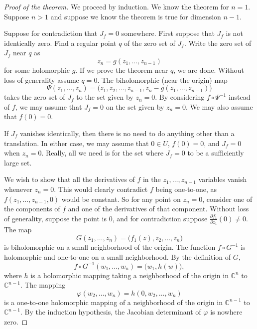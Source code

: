 \documentclass[12pt,openany]{book}
\newcommand{\C}{{\mathbb{C}}}
\theoremstyle{plain}
\theoremstyle{remark}
\theoremstyle{definition}
\theoremstyle{exercise}
\theoremstyle{example}
\begin{document}
\begin{proof}[Proof of the theorem]
We proceed by induction.  We know the theorem for $n=1$.
Suppose $n > 1$ and suppose we know the theorem is true for dimension $n-1$.

Suppose for contradiction that $J_f = 0$ somewhere.
First suppose that $J_f$ is not identically zero.
Find a regular point $q$ of the zero set of $J_f$.
Write the zero set of $J_f$ near $q$ as
\begin{equation*}
z_n = g(z_1,\ldots,z_{n-1})
\end{equation*}
for some holomorphic $g$.
If we prove the theorem near $q$, we are done.  Without loss of generality
assume $q=0$.  The biholomorphic (near the origin) map
\begin{equation*}
\Psi(z_1,\ldots,z_n) = \bigl(z_1,z_2,\ldots,z_{n-1},z_n-g(z_1,\ldots,z_{n-1}) \bigr)
\end{equation*}
takes the zero set of $J_f$ to the set given by $z_n=0$.  By considering
$f \circ \Psi^{-1}$ instead of $f$, we may assume
that $J_f = 0$ on the set given by $z_n=0$.  We may also
assume that $f(0) = 0$.

If $J_f$ vanishes identically, then there is no need to do anything other
than a translation.  In either case,
we may assume that $0 \in U$, $f(0)=0$, and
$J_f = 0$ when $z_n=0$.
Really, all we need is for the set where $J_f=0$ to be a sufficiently
large set.

We wish to show that all the derivatives of $f$ in the $z_1,\ldots,z_{n-1}$
variables vanish whenever $z_n = 0$.  This
would clearly contradict $f$ being one-to-one,
as $f(z_1,\ldots,z_{n-1},0)$ would be constant.
So for any point on $z_n=0$,
consider one of the components
of $f$ and one of the derivatives of that component.
Without loss of generality, suppose the point is $0$, and
for contradiction suppose
$\frac{\partial f_1}{\partial z_1}(0) \not= 0$.
The map
\begin{equation*}
G(z_1,\ldots,z_n) = \bigl(f_1(z),z_2,\ldots,z_n\bigr)
\end{equation*}
is biholomorphic on a small neighborhood of the origin.
The function $f \circ G^{-1}$ is holomorphic and one-to-one on a small
neighborhood.  By the definition of $G$,
\begin{equation*}
f \circ G^{-1} (w_1,\ldots,w_n) = \bigl(w_1,h(w)\bigr) ,
\end{equation*}
where $h$ is a holomorphic mapping taking a neighborhood of the
origin in $\C^n$ to $\C^{n-1}$.
The mapping
\begin{equation*}
\varphi(w_2,\ldots,w_n) = h(0,w_2,\ldots,w_n)
\end{equation*}
is a one-to-one holomorphic mapping of a neighborhood of the origin in
$\C^{n-1}$ to $\C^{n-1}$.  By the induction hypothesis, the Jacobian determinant of
$\varphi$ is nowhere zero.


\end{proof}
\end{document}

